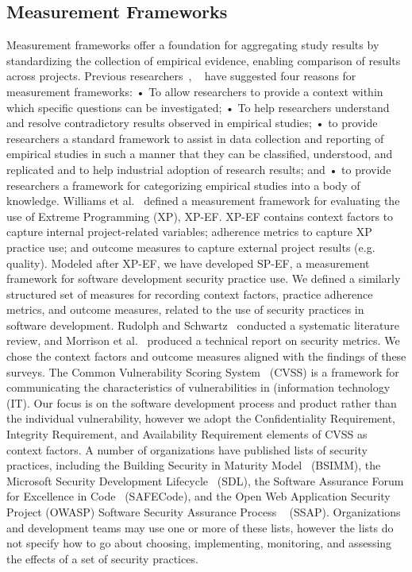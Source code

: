 \subsection{Measurement Frameworks}
Measurement frameworks offer a foundation for aggregating study results by standardizing the collection of empirical evidence, enabling comparison of results across projects. Previous researchers~\cite{kitchenham1999towards}, ~\cite{williams2004toward} have suggested four reasons for measurement frameworks: 
• To allow researchers to provide a context within which specific questions can be investigated;
• To help researchers understand and resolve contradictory results observed in empirical studies;
• to provide researchers a standard framework to assist in data collection and reporting of empirical studies in such a manner that they can be classified, understood, and replicated and to help industrial adoption of research results; and
• to provide researchers a framework for categorizing empirical studies into a body of knowledge.
Williams et al.~\cite{williams2004toward} defined a measurement framework for evaluating the use of Extreme Programming (XP), XP-EF. XP-EF contains context factors to capture internal project-related variables; adherence metrics to capture XP practice use; and outcome measures to capture external project results (e.g. quality). Modeled after XP-EF, we have developed SP-EF, a measurement framework for software development security practice use. We defined a similarly structured set of measures for recording context factors, practice adherence metrics, and outcome measures, related to the use of security practices in software development.
Rudolph and Schwartz~\cite{rudolph2012critical} conducted a systematic literature review, and Morrison et al.~\cite{morrison2014mapping} produced a technical report on security metrics. We chose the context factors and outcome measures aligned with the findings of these surveys.
The Common Vulnerability Scoring System~\cite{mell2006common} (CVSS) is a framework for communicating the characteristics of vulnerabilities in  (information technology (IT). Our focus is on the software development process and product rather than the individual vulnerability, however we adopt the Confidentiality Requirement, Integrity Requirement, and Availability Requirement elements of CVSS as context factors.
A number of organizations have published lists of security practices, including the Building Security in Maturity Model~\cite{mcgraw2013bsimm} (BSIMM), the Microsoft Security Development Lifecycle~\cite{howard2009security} (SDL), the Software Assurance Forum for Excellence in Code~\cite{simpson2013fundamental} (SAFECode), and the Open Web Application Security Project (OWASP) Software Security Assurance Process ~\cite{martinez2014ssap} (SSAP). Organizations and development teams may use one or more of these lists, however the lists do not specify how to go about choosing, implementing, monitoring, and assessing the effects of a set of security practices.
